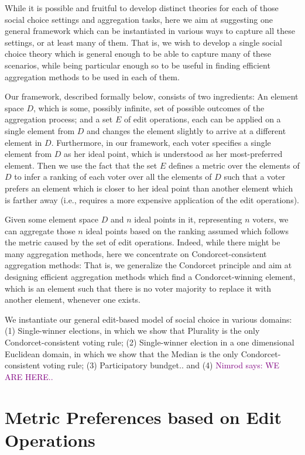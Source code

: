 \documentclass[sigconf]{aamas}  %
\newcommand{\nimrod}[1]{\textcolor{purple}{Nimrod says: #1}}
\begin{document}
While it is possible and fruitful to develop distinct theories for each of those social choice settings and aggregation tasks, here we aim at suggesting one general framework which can be instantiated in various ways to capture all these settings, or at least many of them.
That is, we wish to develop a single social choice theory which is general enough to be able to capture many of these scenarios, while being particular enough so to be useful in finding efficient aggregation methods to be used in each of them.

Our framework, described formally below, consists of two ingredients:
  An element space $D$, which is some, possibly infinite, set of possible outcomes of the aggregation process;
  and a set $E$ of edit operations, each can be applied on a single element from $D$ and changes the element slightly to arrive at a different element in $D$.
Furthermore, in our framework, each voter specifies a single element from $D$ as her ideal point, which is understood as her most-preferred element. Then we use the fact that the set $E$ defines a metric over the elements of $D$ to infer a ranking of each voter over all the elements of $D$ such that a voter prefers an element which is closer to her ideal point than another element which is farther away (i.e., requires a more expensive application of the edit operations).

Given some element space $D$ and $n$ ideal points in it, representing $n$ voters, we can aggregate those $n$ ideal points based on the ranking assumed which follows the metric caused by the set of edit operations. Indeed, while there might be many aggregation methods, here we concentrate on Condorcet-consistent aggregation methods:
  That is, we generalize the Condorcet principle and aim at designing efficient aggregation methods which find a Condorcet-winning element, which is an element such that there is no voter majority to replace it with another element, whenever one exists.
  
We instantiate our general edit-based model of social choice in various domains:
  (1) Single-winner elections, in which we show that Plurality is the only Condorcet-consistent voting rule;
  (2) Single-winner election in a one dimensional Euclidean domain, in which we show that the Median is the only Condorcet-consistent voting rule;
  (3) Participatory bundget..
  and (4) \nimrod{WE ARE HERE..}



\section{Metric Preferences based on Edit Operations}
\end{document}
